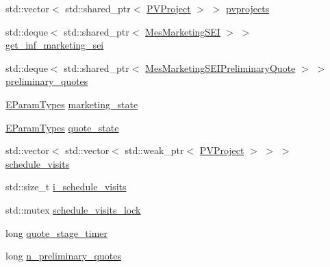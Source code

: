 {\bf }\par
\begin{DoxyCompactItemize}
\item 
std\+::vector$<$ std\+::shared\+\_\+ptr$<$ \hyperlink{classsolar__core_1_1_p_v_project}{P\+V\+Project} $>$ $>$ \hyperlink{classsolar__core_1_1_household_a79c0e955af98669487e0fb472811f842}{pvprojects}
\end{DoxyCompactItemize}

{\bf }\par
\begin{DoxyCompactItemize}
\item 
std\+::deque$<$ std\+::shared\+\_\+ptr$<$ \hyperlink{classsolar__core_1_1_mes_marketing_s_e_i}{Mes\+Marketing\+S\+E\+I} $>$ $>$ \hyperlink{classsolar__core_1_1_household_a3ae4cec5fca43ee5ca3287a01f5a05a2}{get\+\_\+inf\+\_\+marketing\+\_\+sei}
\item 
std\+::deque$<$ std\+::shared\+\_\+ptr$<$ \hyperlink{classsolar__core_1_1_mes_marketing_s_e_i_preliminary_quote}{Mes\+Marketing\+S\+E\+I\+Preliminary\+Quote} $>$ $>$ \hyperlink{classsolar__core_1_1_household_a297842358a2d79db160566106972bc0d}{preliminary\+\_\+quotes}
\item 
\hyperlink{namespacesolar__core_aa1147341e5ef7a40d68d1bd68e149362}{E\+Param\+Types} \hyperlink{classsolar__core_1_1_household_a3ee8b2654cad46236d11f85a4ccd9574}{marketing\+\_\+state}
\end{DoxyCompactItemize}

{\bf }\par
\begin{DoxyCompactItemize}
\item 
\hyperlink{namespacesolar__core_aa1147341e5ef7a40d68d1bd68e149362}{E\+Param\+Types} \hyperlink{classsolar__core_1_1_household_a4ae618de9a28895317824b185b57ab24}{quote\+\_\+state}
\item 
std\+::vector$<$ std\+::vector$<$ std\+::weak\+\_\+ptr$<$ \hyperlink{classsolar__core_1_1_p_v_project}{P\+V\+Project} $>$ $>$ $>$ \hyperlink{classsolar__core_1_1_household_aadd4e3e2fc66ed214bcfadf37f557b14}{schedule\+\_\+visits}
\item 
std\+::size\+\_\+t \hyperlink{classsolar__core_1_1_household_a077c668f06c009a43c535f1ad92cf92e}{i\+\_\+schedule\+\_\+visits}
\item 
std\+::mutex \hyperlink{classsolar__core_1_1_household_a15e598cfc419040a23f75fe08a8ef1d8}{schedule\+\_\+visits\+\_\+lock}
\item 
long \hyperlink{classsolar__core_1_1_household_a6b35426fd691daa6d352ec34a6ec6e4d}{quote\+\_\+stage\+\_\+timer}
\item 
long \hyperlink{classsolar__core_1_1_household_aedfc08b7837a3e2fa6ad9e62309694f3}{n\+\_\+preliminary\+\_\+quotes}
\end{DoxyCompactItemize}

